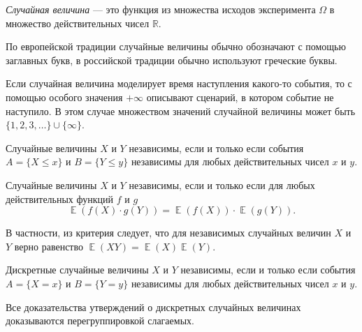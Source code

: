 \documentclass{article}
\DeclareMathOperator{\E}{\mathbb{E}}
\newcommand{\RR}{\mathbb{R}}
\begin{document}
\begin{definition}\label{def:random-variable}
\textit{Случайная величина} — это функция из множества исходов эксперимента $\Omega$ в множество действительных чисел $\RR$.
\end{definition}

По европейской традиции случайные величины обычно обозначают с помощью заглавных букв,
в российской традиции обычно используют греческие буквы.

Если случайная величина моделирует время наступления какого-то события, 
то с помощью особого значения $+\infty$ описывают сценарий, в котором событие не наступило. 
В этом случае множеством значений случайной величины может быть $\{1, 2, 3, \dots\} \cup \{\infty\}$.
    

\begin{theorem}\label{thm:rv-independency}
Случайные величины $X$ и $Y$ независимы, если и только если события $A = \{X \leq x\}$ и $B = \{Y \leq y\}$
независимы для любых действительных чисел $x$ и $y$.
\end{theorem}

\begin{theorem}\label{thm:rv-independency-expectation}
Случайные величины $X$ и $Y$ независимы, если и только если для любых действительных функций $f$ и $g$
\[
\E(f(X)\cdot g(Y)) = \E(f(X)) \cdot \E(g(Y)).
\]
\end{theorem}
    
В частности, из критерия следует, что для независимых случайных величин $X$ и $Y$ верно равенство $\E(XY) = \E(X)\E(Y)$.




\begin{theorem}\label{thm:rv-independency-discrete}
Дискретные случайные величины $X$ и $Y$ независимы, если и только если события $A = \{X = x\}$ и $B = \{Y = y\}$
независимы для любых действительных чисел $x$ и $y$.
\end{theorem}


\begin{metatheorem}\label{mthm:discrete-proofs}
Все доказательства утверждений о дискретных случайных величинах доказываются перегруппировкой слагаемых. 
\end{metatheorem}
\end{document}
